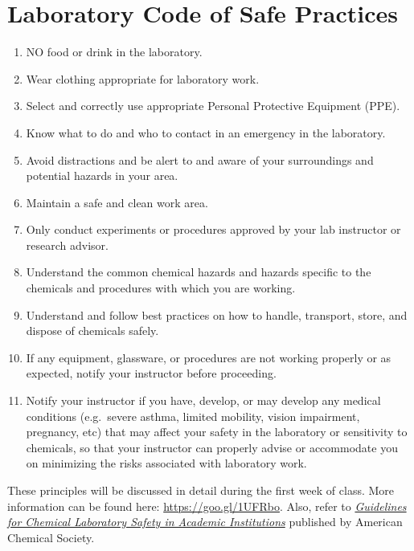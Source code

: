 \hypertarget{sec:laboratory-code-of-safe-practices}{%
\section{Laboratory Code of Safe
Practices}\label{sec:laboratory-code-of-safe-practices}}

\begin{enumerate}
\def\labelenumi{\arabic{enumi}.}
\tightlist
\item
  NO food or drink in the laboratory.
\item
  Wear clothing appropriate for laboratory work.
\item
  Select and correctly use appropriate Personal Protective Equipment
  (PPE).
\item
  Know what to do and who to contact in an emergency in the laboratory.
\item
  Avoid distractions and be alert to and aware of your surroundings and
  potential hazards in your area.
\item
  Maintain a safe and clean work area.
\item
  Only conduct experiments or procedures approved by your lab instructor
  or research advisor.
\item
  Understand the common chemical hazards and hazards specific to the
  chemicals and procedures with which you are working.
\item
  Understand and follow best practices on how to handle, transport,
  store, and dispose of chemicals safely.
\item
  If any equipment, glassware, or procedures are not working properly or
  as expected, notify your instructor before proceeding.
\item
  Notify your instructor if you have, develop, or may develop any
  medical conditions (e.g.~severe asthma, limited mobility, vision
  impairment, pregnancy, etc) that may affect your safety in the
  laboratory or sensitivity to chemicals, so that your instructor can
  properly advise or accommodate you on minimizing the risks associated
  with laboratory work.
\end{enumerate}

These principles will be discussed in detail during the first week of
class. More information can be found here: \url{https://goo.gl/1UFRbo}.
Also, refer to
\href{https://www.acs.org/content/dam/acsorg/about/governance/committees/chemicalsafety/publications/acs-safety-guidelines-academic.pdf}{\emph{Guidelines
for Chemical Laboratory Safety in Academic Institutions}} published by
American Chemical Society.

